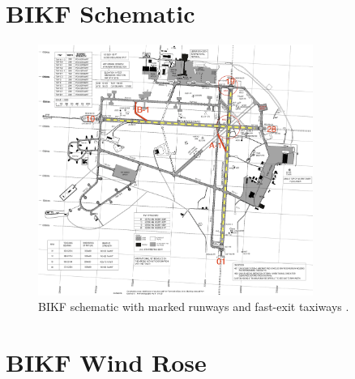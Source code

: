 \clearpage
\chapter{BIKF Schematic}

\begin{figure}[h]
    \centering
    \includegraphics[width=0.8\textwidth]{graphics/BIKF_schematic.png}
    \caption[BIKF schematic]{BIKF schematic with marked runways and fast-exit taxiways \cite{BIKF_scheme}.}
    \label{fig:BIKF_schematic}
\end{figure}


\clearpage
\chapter{BIKF Wind Rose}

